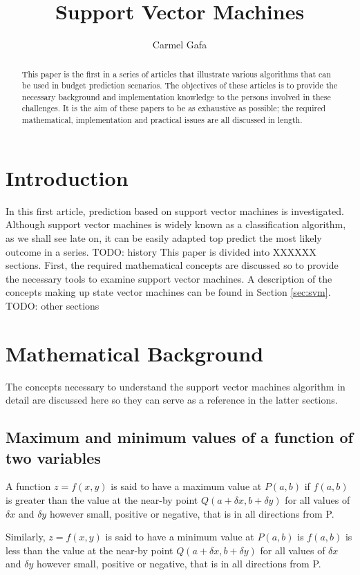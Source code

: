 \documentclass[]{article}
\title{Support Vector Machines}
\author{Carmel Gafa}
\begin{document}
\maketitle

\begin{abstract}
This paper is the first in a series of articles that illustrate various algorithms that can be used in budget prediction scenarios. The objectives of these articles is to provide the necessary background and implementation knowledge to the persons involved in these challenges. It is the aim of these papers to be as exhaustive as possible; the required mathematical, implementation and practical issues are all discussed in length.
\end{abstract}

\section{Introduction}
In this first article, prediction based on support vector machines is investigated. Although support vector machines is widely known as a classification algorithm, as we shall see late on, it can be easily adapted top predict the most likely outcome in a series. 
TODO: history This paper is divided into XXXXXX
sections. First, the required mathematical concepts are discussed so to provide the necessary tools to examine support vector machines. A description of the concepts making up state vector machines can be found in Section \ref{sec:svm}.
TODO: other sections


\section{Mathematical Background}
The concepts necessary to understand the support vector machines algorithm in detail are discussed here so they can serve as a reference in the latter sections.

\subsection{Maximum and minimum values of a function of two variables}

A function $z = f(x,y)$ is said to have a maximum value at $P(a,b)$ if $f(a,b)$ is greater than the value at the near-by point $Q(a+\delta x, b+\delta y)$ for all values of $\delta x$ and $\delta y$ however small, positive or negative, that is in all directions from P.

Similarly,  $z = f(x,y)$ is said to have a minimum value at $P(a,b)$ is $f(a,b)$ is less than the value at the near-by point $Q(a+\delta x, b+\delta y)$ for all values of $\delta x$ and $\delta y$ however small, positive or negative, that is in all directions from P.
\end{document}
